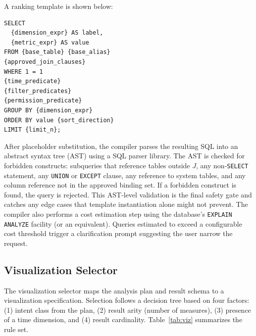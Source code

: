 \documentclass[11pt]{article}
\begin{document}
A ranking template is shown below:
\begin{verbatim}
SELECT
  {dimension_expr} AS label,
  {metric_expr} AS value
FROM {base_table} {base_alias}
{approved_join_clauses}
WHERE 1 = 1
{time_predicate}
{filter_predicates}
{permission_predicate}
GROUP BY {dimension_expr}
ORDER BY value {sort_direction}
LIMIT {limit_n};
\end{verbatim}
After placeholder substitution, the compiler parses the resulting SQL into an abstract syntax tree (AST) using a SQL parser library. The AST is checked for forbidden constructs: subqueries that reference tables outside $J$, any non‑\texttt{SELECT} statement, any \texttt{UNION} or \texttt{EXCEPT} clause, any reference to system tables, and any column reference not in the approved binding set. If a forbidden construct is found, the query is rejected. This AST‑level validation is the final safety gate and catches any edge cases that template instantiation alone might not prevent. The compiler also performs a cost estimation step using the database's \texttt{EXPLAIN ANALYZE} facility (or an equivalent). Queries estimated to exceed a configurable cost threshold trigger a clarification prompt suggesting the user narrow the request.

\subsection{Visualization Selector}
The visualization selector maps the analysis plan and result schema to a visualization specification. Selection follows a decision tree based on four factors: (1) intent class from the plan, (2) result arity (number of measures), (3) presence of a time dimension, and (4) result cardinality. Table~\ref{tab:viz} summarizes the rule set.
\end{document}
